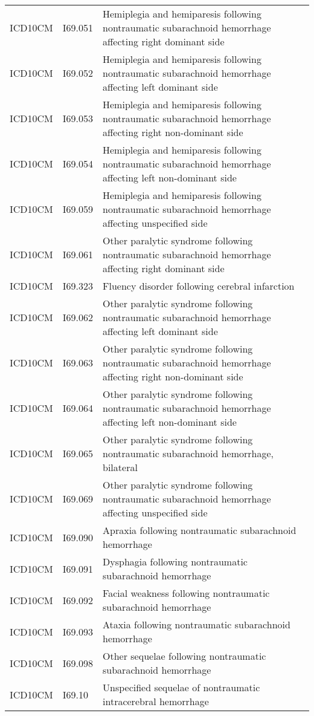 \begin{longtable}{p{}p{}p{}}
  ICD10CM & I69.051 & Hemiplegia and hemiparesis following nontraumatic subarachnoid hemorrhage affecting right dominant side \\ 
  ICD10CM & I69.052 & Hemiplegia and hemiparesis following nontraumatic subarachnoid hemorrhage affecting left dominant side \\ 
  ICD10CM & I69.053 & Hemiplegia and hemiparesis following nontraumatic subarachnoid hemorrhage affecting right non-dominant side \\ 
  ICD10CM & I69.054 & Hemiplegia and hemiparesis following nontraumatic subarachnoid hemorrhage affecting left non-dominant side \\ 
  ICD10CM & I69.059 & Hemiplegia and hemiparesis following nontraumatic subarachnoid hemorrhage affecting unspecified side \\ 
  ICD10CM & I69.061 & Other paralytic syndrome following nontraumatic subarachnoid hemorrhage affecting right dominant side \\ 
  ICD10CM & I69.323 & Fluency disorder following cerebral infarction \\ 
  ICD10CM & I69.062 & Other paralytic syndrome following nontraumatic subarachnoid hemorrhage affecting left dominant side \\ 
  ICD10CM & I69.063 & Other paralytic syndrome following nontraumatic subarachnoid hemorrhage affecting right non-dominant side \\ 
  ICD10CM & I69.064 & Other paralytic syndrome following nontraumatic subarachnoid hemorrhage affecting left non-dominant side \\ 
  ICD10CM & I69.065 & Other paralytic syndrome following nontraumatic subarachnoid hemorrhage, bilateral \\ 
  ICD10CM & I69.069 & Other paralytic syndrome following nontraumatic subarachnoid hemorrhage affecting unspecified side \\ 
  ICD10CM & I69.090 & Apraxia following nontraumatic subarachnoid hemorrhage \\ 
  ICD10CM & I69.091 & Dysphagia following nontraumatic subarachnoid hemorrhage \\ 
  ICD10CM & I69.092 & Facial weakness following nontraumatic subarachnoid hemorrhage \\ 
  ICD10CM & I69.093 & Ataxia following nontraumatic subarachnoid hemorrhage \\ 
  ICD10CM & I69.098 & Other sequelae following nontraumatic subarachnoid hemorrhage \\ 
  ICD10CM & I69.10 & Unspecified sequelae of nontraumatic intracerebral hemorrhage \\ 

\end{longtable}
